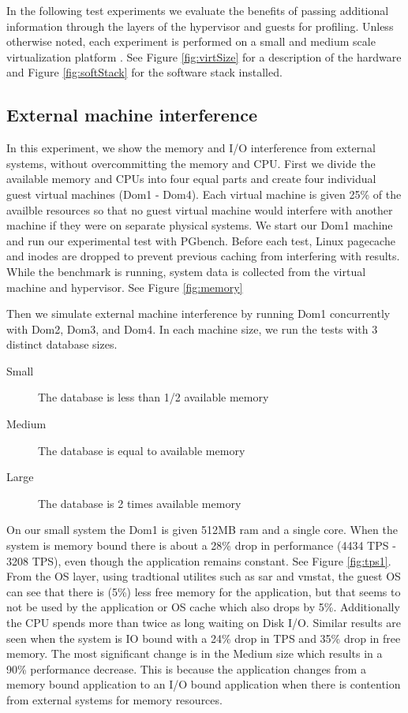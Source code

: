 In the following test experiments we evaluate the benefits of passing additional information through the layers of the hypervisor and guests for profiling.  Unless otherwise noted, each experiment is performed on a small and medium scale virtualization platform . See Figure \ref{fig:virtSize} for a description of the hardware and Figure \ref{fig:softStack} for the software stack installed.

\subsection{External machine interference}
In this experiment, we show the memory and I/O interference from external systems, without overcommitting the memory and CPU.  First we divide the available memory and CPUs into four equal parts and create four individual guest virtual machines (Dom1 - Dom4).  Each virtual machine is given 25\% of the availble resources so that no guest virtual machine would interfere with another machine if they were on separate physical systems.  We start our Dom1 machine and run our experimental test with PGbench.  Before each test, Linux pagecache and inodes are dropped to prevent previous caching from interfering with results.   While the benchmark is running, system data is collected from the virtual machine and hypervisor.  See Figure \ref{fig:memory}

Then we simulate external machine interference by running Dom1 concurrently with Dom2, Dom3, and Dom4.  In each machine size, we run the tests with 3 distinct database sizes.
\begin{description}
  \item[Small] The database is less than 1/2 available memory
  \item[Medium] The database is equal to available memory
  \item[Large] The database is 2 times available memory
\end{description}

On our small system the Dom1 is given 512MB ram and a single core.  When the system is memory bound there is about a 28\% drop in performance (4434 TPS - 3208 TPS), even though the application remains constant.  See Figure \ref{fig:tps1}.
From the OS layer, using tradtional utilites such as sar and vmstat, the guest OS can see that there is (5\%) less free memory for the application, but that seems to not be used by the application or OS cache which also drops by 5\%.  Additionally the CPU spends more than twice as long waiting on Disk I/O.
\newline
Similar results are seen when the system is IO bound with a 24\% drop in TPS and 35\% drop in free memory.  The most significant change is in the Medium size which results in a 90\% performance decrease.  This is because the application changes from a memory bound application to an I/O bound application when there is contention from external systems for memory resources.  

